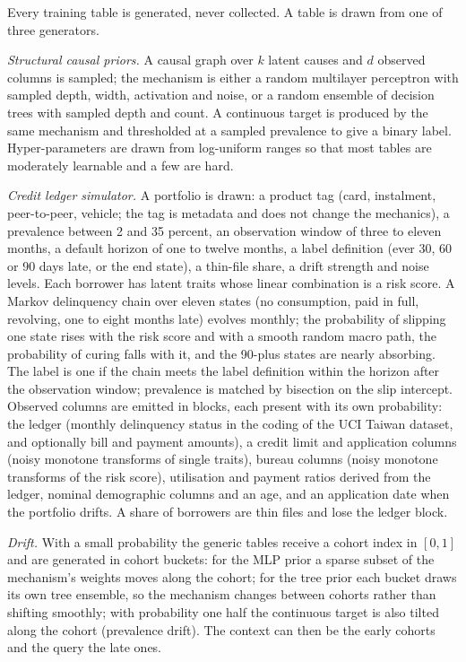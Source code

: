 \documentclass[twocolumn,10pt]{article}
\begin{document}
Every training table is generated, never collected. A table is drawn from one of three generators.

\emph{Structural causal priors.} A causal graph over $k$ latent causes and $d$ observed columns is sampled; the
mechanism is either a random multilayer perceptron with sampled depth, width, activation and noise, or a random
ensemble of decision trees with sampled depth and count. A continuous target is produced by the same mechanism and
thresholded at a sampled prevalence to give a binary label. Hyper-parameters are drawn from log-uniform ranges so that
most tables are moderately learnable and a few are hard.

\emph{Credit ledger simulator.} A portfolio is drawn: a product tag (card, instalment, peer-to-peer, vehicle; the tag
is metadata and does not change the mechanics), a prevalence between 2 and 35 percent, an observation window of three to
eleven months, a default horizon of one to twelve months, a label definition (ever 30, 60 or 90 days late, or the end
state), a thin-file share, a drift strength and noise levels. Each borrower has latent traits whose linear combination
is a risk score. A Markov delinquency chain over eleven states (no consumption, paid in full, revolving, one to eight
months late) evolves monthly; the probability of slipping one state rises with the risk score and with a smooth random
macro path, the probability of curing falls with it, and the 90-plus states are nearly absorbing. The label is one if the
chain meets the label definition within the horizon after the observation window; prevalence is matched by bisection on
the slip intercept. Observed columns are emitted in blocks, each present with its own probability: the ledger (monthly
delinquency status in the coding of the UCI Taiwan dataset, and optionally bill and payment amounts), a credit limit and
application columns (noisy monotone transforms of single traits), bureau columns (noisy monotone transforms of the risk
score), utilisation and payment ratios derived from the ledger, nominal demographic columns and an age, and an
application date when the portfolio drifts. A share of borrowers are thin files and lose the ledger block.

\emph{Drift.} With a small probability the generic tables receive a cohort index in $[0,1]$ and are generated in
cohort buckets: for the MLP prior a sparse subset of the mechanism's weights moves along the cohort; for the tree prior
each bucket draws its own tree ensemble, so the mechanism changes between cohorts rather than shifting smoothly; with
probability one half the continuous target is also tilted along the cohort (prevalence drift). The context can then be
the early cohorts and the query the late ones.
\end{document}
